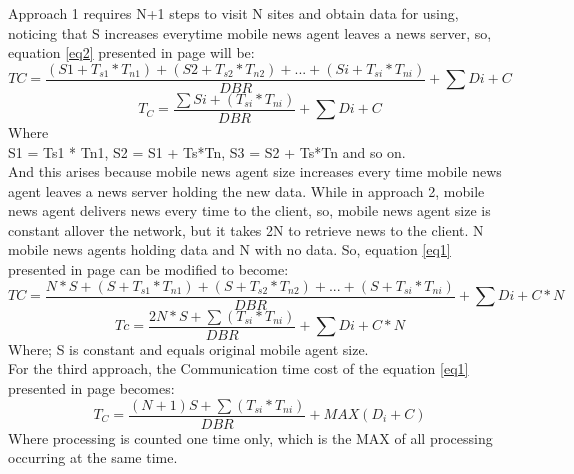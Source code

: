 \documentclass[12pt,a4paper,final,twoside,onecolumn,titlepage]{book}
\begin{document}
Approach 1 requires N+1 steps to visit N sites and obtain data for using, noticing that S increases everytime mobile news agent leaves a news server, so, equation \ref{eq2} presented in page \pageref{eq2} will be:
\begin{equation}
TC = \frac{(S1 + T_{s1} * T_{n1} ) + (S2 + T_{s2} * T_{n2}) + ... + (Si + T_{si} * T_{ni})}{DBR} + \sum Di + C
\end{equation}
\begin{equation}
T_{C} = \frac{\sum Si + (T_{si} * T_{ni})}{DBR} + \sum Di + C 
\end{equation}
Where \\
S1 = Ts1 * Tn1,  S2 = S1 + Ts*Tn, S3 = S2 + Ts*Tn	and so on. \\
And this arises because mobile news agent size increases every time mobile news agent leaves a news server holding the new data. While in approach 2, mobile news agent delivers news every time to the client, so, mobile news agent size is constant allover the network, but it takes 2N to retrieve news to the client. N mobile news agents holding data and N with no data. So, equation \ref{eq1} presented in page \pageref{eq1} can be modified to become:
\begin{equation}
TC = \frac{N*S + (S + T_{s1}*T_{n1}) + (S + T_{s2} * T_{n2}) + ... + (S + T_{si} * T_{ni})}{DBR} + \sum Di + C * N
\end{equation}
\begin{equation}
Tc = \frac{2N * S + \sum (T_{si} * T_{ni})}{DBR} + \sum Di + C * N
\end{equation}
Where; S is constant and equals original mobile agent size.\\
For the third approach, the Communication time cost of the equation \ref{eq1} presented in page \pageref{eq1} becomes:
\begin{equation}
T_{C} = \frac{(N+1)S + \sum (T_{si} * T_{ni})}{DBR} + MAX(D_{i} + C)
\end{equation}
Where processing is counted one time only, which is the MAX of all processing occurring at the same time.
\end{document}
